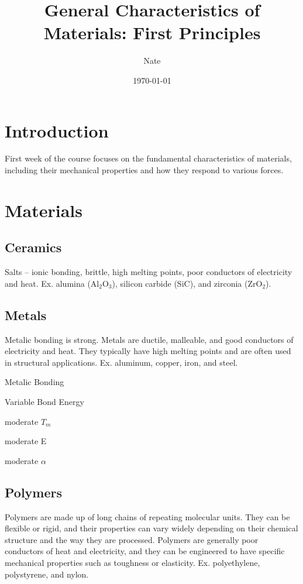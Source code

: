 \documentclass[12pt]{article}
\title{General Characteristics of Materials: First Principles}
\author{Nate}
\date{\today}
\begin{document}
\maketitle
\tableofcontents
\newpage

\section{Introduction}
First week of the course focuses on the fundamental characteristics of materials, including their mechanical properties and how they respond to various forces.

\section{Materials}
\subsection{Ceramics}
Salts -- ionic bonding, brittle, high melting points, poor conductors of electricity and heat.
Ex. alumina (Al$_2$O$_3$), silicon carbide (SiC), and zirconia (ZrO$_2$).

\begin{list}{ceramics}{spacing}
    \item 
\end{list}

\subsection{Metals}
Metalic bonding is strong. Metals are ductile, malleable, and good conductors of electricity and heat.
They typically have high melting points and are often used in structural applications.
Ex. aluminum, copper, iron, and steel.

\begin{list}{metals}{spacing}
    \item Metalic Bonding
    \item Variable Bond Energy
    \item moderate $T_m$
    \item moderate E
    \item moderate $\alpha$
\end{list}

\subsection{Polymers}
Polymers are made up of long chains of repeating molecular units. 
They can be flexible or rigid, and their properties can vary widely depending on their chemical structure and the way they are processed. 
Polymers are generally poor conductors of heat and electricity, and they can be engineered to have specific mechanical properties such as toughness or elasticity.
Ex. polyethylene, polystyrene, and nylon.
\end{document}
